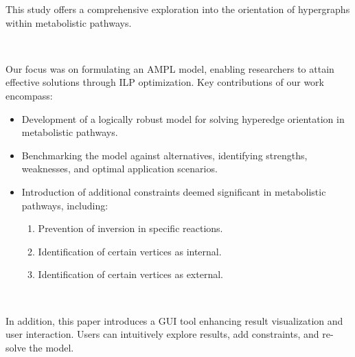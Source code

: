 This study offers a comprehensive exploration into the orientation of hypergraphs within metabolistic pathways.

~


Our focus was on formulating an AMPL model, enabling researchers to attain effective solutions through ILP optimization. Key contributions of our work encompass:

\begin{itemize}
\item Development of a logically robust model for solving hyperedge orientation in metabolistic pathways.
\item Benchmarking the model against alternatives, identifying strengths, weaknesses, and optimal application scenarios.
\item Introduction of additional constraints deemed significant in metabolistic pathways, including:
\begin{enumerate}[left=2em]
\item Prevention of inversion in specific reactions.
\item Identification of certain vertices as internal.
\item Identification of certain vertices as external.
\end{enumerate}
\end{itemize}

~

In addition, this paper introduces a GUI tool enhancing result visualization and user interaction. Users can intuitively explore results, add constraints, and re-solve the model.
